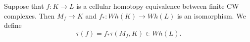 Suppose that $f: K \rightarrow L$ is a cellular homotopy equivalence between finite CW complexes. Then $M_f \rightarrow K$ and $f_*: Wh(K) \rightarrow Wh(L)$ is an isomorphism. We define
$$\tau(f) = f_* \tau(M_f, K) \in Wh(L).$$

